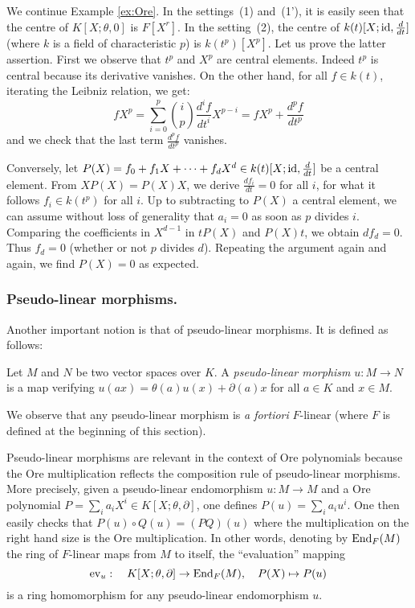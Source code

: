 \documentclass[a4paper]{llncs}
\newcommand{\id}{\textrm{\rm id}}
\newcommand{\End}{\textrm{\rm End}}
\newcommand{\ev}[1]{\textrm{\rm ev}_{#1}}
\begin{document}
\begin{example}
\label{ex:centre}
We continue Example \ref{ex:Ore}. In the settings~(1) and~(1'), it is 
easily seen that the centre of $K[X;\theta,0]$ is $F[X^r]$.
In the setting~(2), the centre of $k(t)[X; \id, \frac d{dt}]$ (where
$k$ is a field of characteristic $p$) is $k(t^p)[X^p]$. Let us prove
the latter assertion. First we observe that $t^p$ and $X^p$ are 
central elements. Indeed $t^p$ is central because its derivative
vanishes. On the other hand, for all $f \in k(t)$, iterating the 
Leibniz relation, we get:
$$f X^p = \sum_{i=0}^p \binom i p \frac{d^i f}{dt^i} X^{p-i}
= f X^p + \frac{d^p f}{dt^p}$$
and we check that the last term $\frac{d^p f}{dt^p}$ vanishes.

\noindent
Conversely, let $P(X) = f_0 + f_1 X + \cdots + f_d X^d \in k(t)[X; 
\id, \frac d{dt}]$ be a central element. From $X P(X) = P(X) X$, we
derive $\frac {df_i}{dt} = 0$ for all $i$, for what it follows $f_i 
\in k(t^p)$ for all $i$. Up to subtracting to $P(X)$ a central element,
we can assume without loss of generality that $a_i = 0$ as soon as 
$p$ divides $i$. Comparing the coefficients in $X^{d-1}$
in $t P(X)$ and $P(X) t$, we obtain $d f_d = 0$. Thus $f_d = 0$
(whether or not $p$ divides $d$).
Repeating the argument again and again, we find $P(X) = 0$ as 
expected.
\end{example}

\subsubsection*{Pseudo-linear morphisms.}

Another important notion is that of pseudo-linear morphisms. It is 
defined as follows:

\begin{definition}
Let $M$ and $N$ be two vector spaces over $K$.
A \emph{pseudo-linear morphism} $u : M\to N$ is a map verifying 
$u(ax) = \theta(a)u(x) + \partial(a)x$ for all $a \in K$ and $x \in M$.
\end{definition}

We observe that any pseudo-linear morphism is \emph{a fortiori}
$F$-linear (where $F$ is defined at the beginning of this section).

Pseudo-linear morphisms are relevant in the context of Ore polynomials 
because the Ore multiplication reflects the composition rule of 
pseudo-linear morphisms. More precisely, given a pseudo-linear 
endomorphism $u : M \to M$ and a Ore polynomial $P = \sum_i a_i X^i \in 
K[X;\theta,\partial]$, one defines $P(u) = \sum_i a_i u^i$. One then 
easily checks that $P(u) \circ Q(u) = (PQ)(u)$ where the multiplication 
on the right hand size is the Ore multiplication. In other words, 
denoting by $\End_F(M)$ the ring of $F$-linear maps from $M$ to itself, 
the ``evaluation'' mapping
$$\ev{u} : \quad K[X;\theta,\partial] \to \End_F(M), \quad
P(X) \mapsto P(u)$$
is a ring homomorphism for any pseudo-linear endomorphism $u$.
\end{document}
